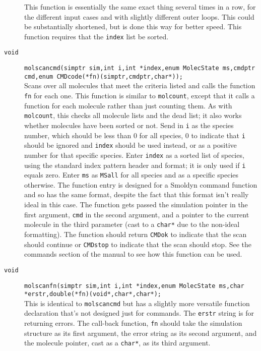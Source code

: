 \documentclass {book}
\begin{document}
\begin{description}
This function is essentially the same exact thing several times in a row, for the different input cases and with slightly different outer loops.  This could be substantially shortened, but is done this way for better speed.  This function requires that the \texttt{index} list be sorted.

\item[\texttt{void}]
\texttt{molscancmd(simptr sim,int i,int *index,enum MolecState ms,cmdptr cmd,enum CMDcode(*fn)(simptr,cmdptr,char*));}
\hfill \\
Scans over all molecules that meet the criteria listed and calls the function \texttt{fn} for each one. This function is similar to \texttt{molcount}, except that it calls a function for each molecule rather than just counting them.  As with \texttt{molcount}, this checks all molecule lists and the dead list; it also works whether molecules have been sorted or not.  Send in \texttt{i} as the species number, which should be less than 0 for all species, 0 to indicate that \texttt{i} should be ignored and \texttt{index} should be used instead, or as a positive number for that specific species.  Enter \texttt{index} as a sorted list of species, using the standard index pattern header and format; it is only used if \texttt{i} equals zero.  Enter \texttt{ms} as \texttt{MSall} for all species and as a specific species otherwise.  The function entry is designed for a Smoldyn command function and so has the same format, despite the fact that this format isn't really ideal in this case.  The function gets passed the simulation pointer in the first argument, \texttt{cmd} in the second argument, and a pointer to the current molecule in the third parameter (cast to a \texttt{char*} due to the non-ideal formatting).  The function should return \texttt{CMDok} to indicate that the scan should continue or \texttt{CMDstop} to indicate that the scan should stop.  See the commands section of the manual to see how this function can be used.

\item[\texttt{void}]
\texttt{molscanfn(simptr sim,int i,int *index,enum MolecState ms,char *erstr,double(*fn)(void*,char*,char*);}
\hfill \\
This is identical to \texttt{molscancmd} but has a slightly more versatile function declaration that's not designed just for commands. The \texttt{erstr} string is for returning errors. The call-back function, \texttt{fn} should take the simulation structure as its first argument, the error string as its second argument, and the molecule pointer, cast as a \texttt{char*}, as its third argument.


\end{description}
\end{document}
